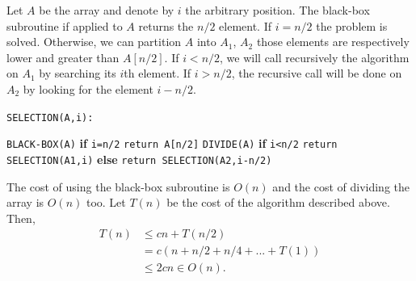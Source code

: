 \documentclass{article}
\begin{document}
	\noindent Let $A$ be the array and denote by $i$ the arbitrary position. The black-box subroutine if applied to $A$ returns the $n/2$ element. If $i=n/2$ the problem is solved. Otherwise, we can partition $A$ into $A_1$, $A_2$ those elements are respectively lower and greater than $A[n/2]$. If $i<n/2$, we will call recursively the algorithm on $A_1$ by searching its $i$th element. If $i>n/2$, the recursive call will be done on $A_2$ by looking for the element $i-n/2$.
	
		\begin{algorithm}
		\texttt{SELECTION(A,i):} 
		\begin{algorithmic}
			\State \texttt{BLACK-BOX(A)} 
			\State \textbf{if} \texttt{i=n/2} \texttt{return A[n/2]}
			\State \texttt{DIVIDE(A)}
			\State \textbf{if} \texttt{i<n/2} \texttt{return SELECTION(A1,i)}
			\State \textbf{else} \texttt{return SELECTION(A2,i-n/2)}
			
		\end{algorithmic}
	\end{algorithm}
	
	The cost of using the black-box subroutine is $O(n)$ and the cost of dividing the array is $O(n)$ too. Let $T(n)$ be the cost of the algorithm described above. Then,
	\begin{align}
	\nonumber
	T(n) & \leq cn + T(n/2) \\
	\nonumber
	& = c(n+n/2+n/4+...+T(1))\\
	\nonumber
	& \leq 2cn \in O(n). 
	\end{align}
	
	
\end{document}

